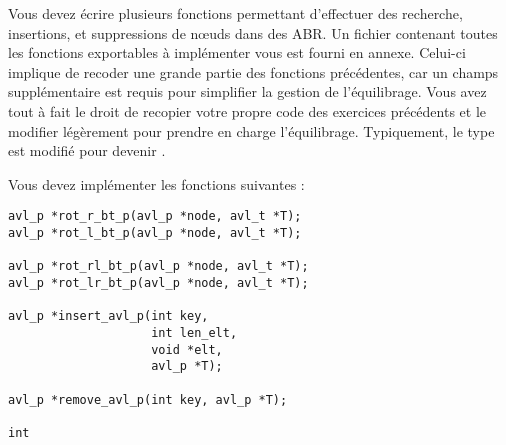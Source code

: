 

\vspace*{0.7cm}

\noindent {}

\bigskip

%

\noindent Vous devez écrire plusieurs fonctions permettant d'effectuer des recherche, insertions, et suppressions de nœuds dans des ABR.
Un fichier  contenant toutes les fonctions exportables à implémenter vous est fourni en annexe.
Celui-ci implique de recoder une grande partie des fonctions précédentes, car un champs supplémentaire est requis pour simplifier la gestion de l'équilibrage.
Vous avez tout à fait le droit de recopier votre propre code des exercices précédents et le modifier légèrement pour prendre en charge l'équilibrage.
Typiquement, le type  est modifié pour devenir .


\bigskip




\bigskip

\noindent Vous devez implémenter les fonctions suivantes :

\bigskip

\lstset{language=C}
\begin{lstlisting}[frame=single]
avl_p *rot_r_bt_p(avl_p *node, avl_t *T);
avl_p *rot_l_bt_p(avl_p *node, avl_t *T);

avl_p *rot_rl_bt_p(avl_p *node, avl_t *T);
avl_p *rot_lr_bt_p(avl_p *node, avl_t *T);

avl_p *insert_avl_p(int key,
                    int len_elt,
                    void *elt,
                    avl_p *T);

avl_p *remove_avl_p(int key, avl_p *T);

int 
\end{lstlisting}


